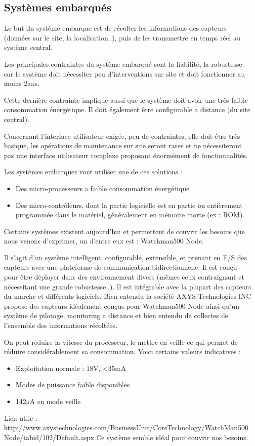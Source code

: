 \documentclass{article}
\begin{document}
\subsection{Systèmes embarqués}

		Le but du système embarque est de récolter les informations des capteurs (données sur le site, la localisation..),
	puis de les transmettre en temps réel au système central.
		
		Les principales contraintes du système embarqué sont la fiabilité, la robustesse car le système doit nécessiter peu d'interventions sur site et doit fonctionner au moins 2ans. 
		
		Cette dernière contrainte implique aussi que le système doit avoir une très faible consommation énergétique. Il doit également être configurable a distance (du site central).
		
		Concernant l'interface utilisateur exigée, peu de contraintes, elle doit être très basique, les opérations de maintenance sur site seront rares et ne nécessiteront pas une interface utilisateur complexe proposant énormément de fonctionnalités.
		
		Les systèmes embarques vont utiliser une de ces solutions :
		\begin{itemize}
				\item Des micro-processeurs a faible consommation énergétique
				\item Des micro-contrôleurs, dont la partie logicielle est en partie ou entièrement programmée dans le matériel, généralement en mémoire morte (ex : ROM).
		\end{itemize}

		Certains systèmes existent aujourd'hui et permettent de couvrir les besoins que nous venons d'exprimer, un d'entre eux est : Watchman500 Node. 

{ Il s'agit d'un système intelligent, configurable, extensible, et prenant en E/S des capteurs avec une plateforme de communication bidirectionnelle.}
{Il est conçu pour être déployer dans des environnement divers (mêmes ceux contraignant et nécessitant une grande robustesse..). Il est intégrable avec la plupart des capteurs du marche et différents logiciels. Bien entendu la société AXYS Technologies INC propose des capteurs idéalement conçus pour Watchman500 Node ainsi qu'un système de pilotage, monitoring a distance et bien entendu de collectes de l'ensemble des informations récoltées.}
{On peut réduire la vitesse du processeur, le mettre en veille ce qui permet de réduire considérablement sa consommation. Voici certains valeurs indicatives : 
\begin{itemize}
       \item Exploitation normale : 18V, <35mA
       \item Modes de puissance faible disponibles
       \item 142μA en mode veille
\end{itemize}
}
{}
{Lien utile : http://www.axystechnologies.com/BusinessUnit/CoreTechnology/WatchMan500Node/tabid/102/Default.aspx}
{Ce système semble idéal pour couvrir nos besoins.}

		
\end{document}
